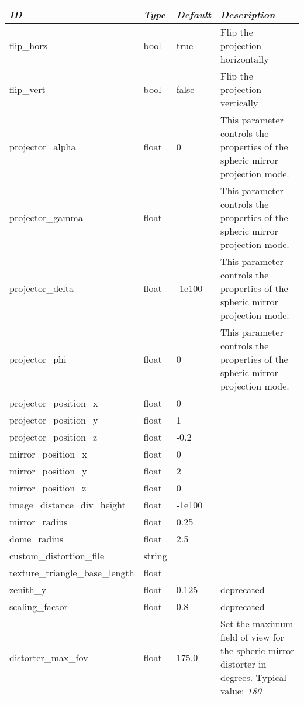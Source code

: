 \begin{longtabu} to \textwidth {l|l|l|X}\toprule
\emph{ID} & \emph{Type} & \emph{Default}&\emph{Description}\\\midrule
flip\_horz             & bool  &true & Flip the projection horizontally\\\midrule
flip\_vert             & bool  &false& Flip the projection vertically\\\midrule
projector\_alpha       & float &0& This parameter controls the properties of the spheric mirror projection mode.\\\midrule
projector\_gamma       & float && This parameter controls the properties of the spheric mirror projection mode.\\\midrule
projector\_delta       & float &-1e100& This parameter controls the properties of the spheric mirror projection mode.\\\midrule
projector\_phi         & float &0& This parameter controls the properties of the spheric mirror projection mode.\\\midrule
projector\_position\_x & float &0& \\\midrule
projector\_position\_y & float &1& \\\midrule
projector\_position\_z & float &-0.2& \\\midrule
mirror\_position\_x    & float &0& \\\midrule
mirror\_position\_y    & float &2& \\\midrule
mirror\_position\_z    & float &0& \\\midrule
image\_distance\_div\_height&float&-1e100\\\midrule
mirror\_radius         & float &0.25& \\\midrule
dome\_radius           & float &2.5& \\\midrule
custom\_distortion\_file& string& \\\midrule
texture\_triangle\_base\_length&float& \\\midrule
zenith\_y              & float &0.125& deprecated\\\midrule
scaling\_factor        & float &0.8  & deprecated \\\midrule
distorter\_max\_fov & float & 175.0&Set the maximum field of view for the spheric mirror distorter in degrees. Typical value: \emph{180}\\\midrule

\end{longtabu}
